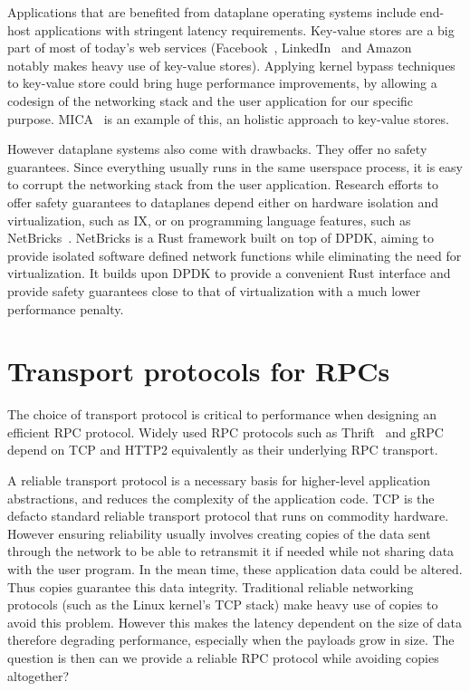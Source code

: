 Applications that are benefited from dataplane operating systems include end-host applications with stringent latency requirements.
Key-value stores are a big part of most of today's
web services (Facebook~\cite{https://www.usenix.org/system/files/conference/nsdi13/nsdi13-final170_update.pdf},
LinkedIn~\cite{https://www.project-voldemort.com/voldemort/} and Amazon~\cite{https://www.allthingsdistributed.com/files/amazon-dynamo-sosp2007.pdf}
notably makes heavy use of
key-value stores). Applying kernel bypass techniques to key-value
store could bring huge performance improvements, by allowing a
codesign of the networking stack and the user application for our
specific purpose. MICA~\cite{mica} is an example of this, an holistic
approach to key-value stores.

However dataplane systems also come with drawbacks.
They offer no safety guarantees.
Since everything usually runs in the same userspace process,
it is easy to corrupt the networking stack from the user application.
Research efforts to offer safety guarantees to dataplanes depend either on hardware isolation and virtualization, such as IX,
or on programming language features, such as NetBricks~\cite{netbricks}.
NetBricks is a Rust framework built on top of DPDK, 
aiming to provide isolated software defined network
functions while eliminating the need for virtualization. It builds
upon DPDK to provide a convenient Rust interface and provide safety
guarantees close to that of virtualization with a much lower
performance penalty.

\section{Transport protocols for RPCs}

The choice of transport protocol is critical to performance when
designing an efficient RPC protocol.
Widely used RPC protocols such as Thrift~\cite{https://thrift.apache.org/} and gRPC~\cite{https://grpc.io/} depend on TCP and HTTP2 equivalently as their underlying RPC transport.

A reliable transport protocol is a necessary basis for higher-level application abstractions,
and reduces the complexity of the application code.
TCP is the defacto standard reliable transport protocol that runs on commodity hardware.
However ensuring reliability usually involves creating copies of the data sent
through the network to be able to retransmit it if needed while not
sharing data with the user program. In the mean time, these application data could be altered.
Thus copies guarantee this data integrity.
Traditional reliable networking protocols (such as the Linux kernel's TCP stack) make heavy use of
copies to avoid this problem. However this makes the latency dependent
on the size of data therefore degrading performance, especially when
the payloads grow in size. The question is then can we provide a
reliable RPC protocol while avoiding copies altogether?

